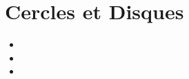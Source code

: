 \chapter{Cercles et Disques}\label{ChCerclesEtDisques}

\vspace{5cm}
\begin{acquis}
\begin{itemize}
\item 
\item 
\item 
\end{itemize}
\end{acquis}


\activites


\cours


\exercicesbase
\begin{colonne*exercice}

\end{colonne*exercice}


\exercicesappr
\begin{colonne*exercice}

\end{colonne*exercice}

\connaissances


\TravauxPratiques
%

\recreation %



